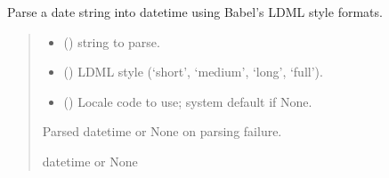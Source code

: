 \documentclass[letterpaper,10pt,english]{sphinxmanual}
\begin{document}
\begin{fulllineitems}
\label{\detokenize{apache_commons_validator_python.util:apache_commons_validator_python.util.datetime_helpers.ldml2strpdate}}
\pysigstartsignatures
{}
\pysigstopsignatures
\sphinxAtStartPar
Parse a date string into datetime using Babel’s LDML style formats.
\begin{quote}\begin{description}
\begin{itemize}
\item {} 
\sphinxAtStartPar
{} () \textendash{}  string to parse.

\item {} 
\sphinxAtStartPar
{} () \textendash{} LDML style (‘short’, ‘medium’, ‘long’, ‘full’).

\item {} 
\sphinxAtStartPar
{} (\sphinxstyleliteralemphasis{\sphinxupquote{, }}) \textendash{} Locale code to use; system default if None.

\end{itemize}

\sphinxAtStartPar
Parsed datetime or None on parsing failure.

\sphinxAtStartPar
datetime or None

\end{description}\end{quote}

\end{fulllineitems}
\end{document}
